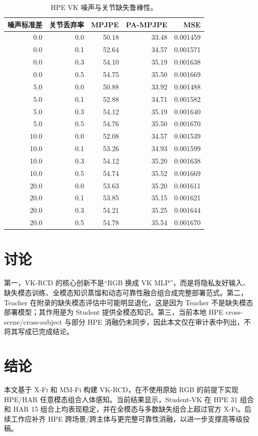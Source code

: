 \documentclass[UTF8,10pt,a4paper]{ctexart}
\newcommand{\method}{VK-RCD}
\newcommand{\xfi}{\textsc{X-Fi}}
\newcommand{\dataset}{MM-Fi}
\begin{document}
\begin{table}[H]\centering\scriptsize
\caption{HPE VK 噪声与关节缺失鲁棒性。}
\begin{tabular}{rrrrr}
\toprule
噪声标准差 & 关节丢弃率 & MPJPE & PA-MPJPE & MSE\\
\midrule
0.0 & 0.0 & 50.18 & 33.48 & 0.001459\\
0.0 & 0.1 & 52.64 & 34.57 & 0.001571\\
0.0 & 0.3 & 54.10 & 35.19 & 0.001638\\
0.0 & 0.5 & 54.75 & 35.50 & 0.001669\\
5.0 & 0.0 & 50.88 & 33.92 & 0.001488\\
5.0 & 0.1 & 52.88 & 34.71 & 0.001582\\
5.0 & 0.3 & 54.12 & 35.19 & 0.001640\\
5.0 & 0.5 & 54.76 & 35.50 & 0.001670\\
10.0 & 0.0 & 52.08 & 34.57 & 0.001539\\
10.0 & 0.1 & 53.26 & 34.93 & 0.001599\\
10.0 & 0.3 & 54.12 & 35.20 & 0.001638\\
10.0 & 0.5 & 54.74 & 35.52 & 0.001669\\
20.0 & 0.0 & 53.63 & 35.20 & 0.001611\\
20.0 & 0.1 & 53.85 & 35.15 & 0.001621\\
20.0 & 0.3 & 54.21 & 35.25 & 0.001644\\
20.0 & 0.5 & 54.78 & 35.54 & 0.001670\\
\bottomrule
\end{tabular}
\end{table}

\section{讨论}
第一，\method{} 的核心创新不是“RGB 换成 VK MLP”，而是将隐私友好输入、缺失模态训练、全模态知识蒸馏和动态可靠性融合组合成完整部署范式。第二，Teacher 在附录的缺失模态评估中可能明显退化，这是因为 Teacher 不是缺失模态部署模型；其作用是为 Student 提供全模态知识。第三，当前本地 HPE cross-scene/cross-subject 与部分 HPE 消融仍未同步，因此本文仅在审计表中列出，不将其写成已完成结论。

\section{结论}
本文基于 \xfi{} 和 \dataset{} 构建 \method{}，在不使用原始 RGB 的前提下实现 HPE/HAR 任意模态组合人体感知。当前结果显示，Student-VK 在 HPE 31 组合和 HAR 15 组合上均表现稳定，并在全模态与多数缺失组合上超过官方 \xfi{}。后续工作应补齐 HPE 跨场景/跨主体与更完整可靠性消融，以进一步支撑高等级投稿。
\end{document}
